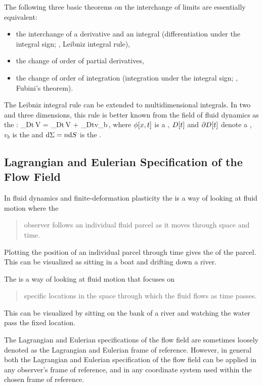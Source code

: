 The following three basic theorems on the interchange of limits are essentially equivalent:
\begin{itemize}
\item the interchange of a derivative and an integral (differentiation under the integral sign; \ie, Leibniz integral rule),
\item the change of order of partial derivatives,
\item the change of order of integration (integration under the integral sign; \ie, Fubini's theorem).
\end{itemize}

The Leibniz integral rule can be extended to multidimensional integrals. In two and three dimensions, this rule is better known from the field of fluid dynamics as the :
\beq
{}\int_{D\vat t}\phi{}\,\dx V 
    = \int_{D\vat t}\,\dx V
      + \int_{\partial D\vat t}\phi{}v_b\iprod\dx\Sigma\,,
\eeq
where $\phi\!\left[{x, t}\right]$ is a , $D\!\left[{t}\right]$ and $\partial D\!\left[{t}\right]$ denote a , $v_b$ is the  and $\text{d}\Sigma = n\text{d} S$ is the .


\subsection{Lagrangian and Eulerian Specification of the Flow Field}
In fluid dynamics and finite-deformation plasticity the  is a way of looking at fluid motion where the
\begin{quote}
observer follows an individual fluid parcel as it moves through space and time.
\end{quote} 
Plotting the position of an individual parcel through time gives the  of the parcel. This can be visualized as sitting in a boat and drifting down a river.

The  is a way of looking at fluid motion that focuses on 
\begin{quote}
specific locations in the space through which the fluid flows as time passes.
\end{quote}
This can be visualized by sitting on the bank of a river and watching the water pass the fixed location.

The Lagrangian and Eulerian specifications of the flow field are sometimes loosely denoted as the Lagrangian and Eulerian frame of reference. However, in general both the Lagrangian and Eulerian specification of the flow field can be applied in any observer's frame of reference, and in any coordinate system used within the chosen frame of reference.

